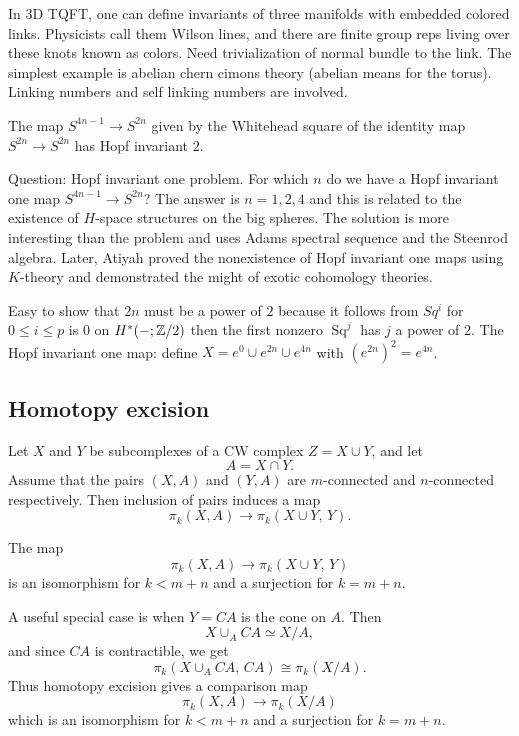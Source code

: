 \documentclass[12pt]{article}
\DeclareMathOperator{\Sq}{Sq}
\begin{document}
In 3D TQFT, one can define invariants of three manifolds with embedded colored links. Physicists call them Wilson lines, and there are finite group reps living over these knots known as colors. Need trivialization of normal bundle to the link. The simplest example is abelian chern cimons theory (abelian means for the torus). Linking numbers and self linking numbers are involved.


\begin{theorem}
    The map $S^{4n-1} \to S^{2n}$ given by the Whitehead square of the identity map $S^{2n} \to S^{2n}$ has Hopf invariant $2$.
\end{theorem}

Question: Hopf invariant one problem. For which $n$ do we have a Hopf invariant one map $S^{4n-1} \to S^{2n}$? The answer is $n=1,2,4$ and this is related to the existence of $H$-space structures on the big spheres. The solution is more interesting than the problem and uses Adams spectral sequence and the Steenrod algebra. Later, Atiyah proved the nonexistence of Hopf invariant one maps using $K$-theory and demonstrated the might of exotic cohomology theories.

Easy to show that $2n$ must be a power of $2$ because it follows from $Sq^i$ for $0 \leq i \leq p$ is $0$ on $H^*(-;\mathbb{Z}/2)$ then the first nonzero $\Sq^j$ has $j$ a power of $2$. The Hopf invariant one map: define $X = e^0 \cup e^{2n} \cup e^{4n}$ with $(e^{2n})^2 = e^{4n}$. 
\subsection{Homotopy excision}

Let $X$ and $Y$ be subcomplexes of a CW complex $Z=X\cup Y$, and let
\[
A=X\cap Y.
\]
Assume that the pairs $(X,A)$ and $(Y,A)$ are $m$-connected and
$n$-connected respectively. Then inclusion of pairs induces a map
\[
\pi_k(X,A)\longrightarrow \pi_k(X\cup Y,\,Y).
\]

\begin{theorem}
The map
\[
\pi_k(X,A)\longrightarrow \pi_k(X\cup Y,\,Y)
\]
is an isomorphism for $k<m+n$ and a surjection for $k=m+n$.
\end{theorem}


\begin{remark}
A useful special case is when $Y=CA$ is the cone on $A$. Then
\[
X\cup_A CA \simeq X/A,
\]
and since $CA$ is contractible, we get
\[
\pi_k(X\cup_A CA,\,CA)\cong \pi_k(X/A).
\]
Thus homotopy excision gives a comparison map
\[
\pi_k(X,A)\longrightarrow \pi_k(X/A)
\]
which is an isomorphism for $k<m+n$ and a surjection for $k=m+n$.
\end{remark}
\end{document}
